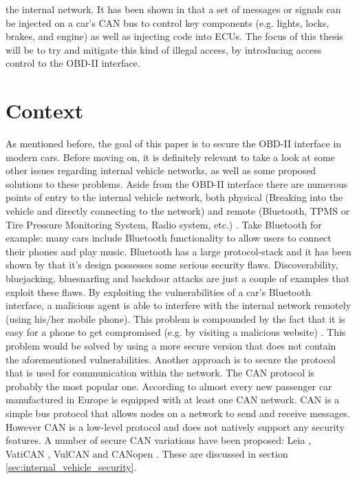 the internal network. It has been shown in \cite{MillerA,Yadav16,MillerB,MillerC} that a set of messages or signals can be injected on a car's CAN bus to control key components (e.g. lights, locks, brakes, and engine) as well as injecting code into ECUs. The focus of this thesis will be to try and mitigate this kind of illegal access, by introducing access control to the OBD-II interface.

\section{Context}
\label{sec:context}

As mentioned before, the goal of this paper is to secure the OBD-II interface in modern cars. Before moving on, it is definitely relevant to take a look at some other issues regarding internal vehicle networks, as well as some proposed solutions to these problems. Aside from the OBD-II interface there are numerous points of entry to the internal vehicle network, both physical (Breaking into the vehicle and directly connecting to the network) and remote (Bluetooth, TPMS or Tire Pressure Monitoring System, Radio system, etc.) \cite{MillerA}. Take Bluetooth for example: many cars include Bluetooth functionality to allow users to connect their phones and play music. Bluetooth has a large protocol-stack and it has been shown by \cite{Bluetooh} that it's design possesses some serious security flaws. Discoverability, bluejacking, bluesnarfing and backdoor attacks are just a couple of examples that exploit these flaws. By exploiting the vulnerabilities of a car's Bluetooth interface, a malicious agent is able to interfere with the internal network remotely (using his/her mobile phone). This problem is compounded by the fact that it is easy for a phone to get compromised (e.g. by visiting a malicious website) \cite{Yadav16}. This problem would be solved by using a more secure version that does not contain the aforementioned vulnerabilities.\newline 
\newline
Another approach is to secure the protocol that is used for communication within the network. The CAN protocol is probably the most popular one. According to \cite{CANhistory} almost every new passenger car manufactured in Europe is equipped with at least one CAN network. CAN is a simple bus protocol that allows nodes on a network to send and receive messages. However CAN is a low-level protocol and does not natively support any security features. A number of secure CAN variations have been proposed: Leia \cite{Leia}, VatiCAN \cite{VatiCAN}, VulCAN \cite{VulCAN} and CANopen \cite{Pfeiffer}. These are discussed in section \ref{sec:internal_vehicle_security}. 

